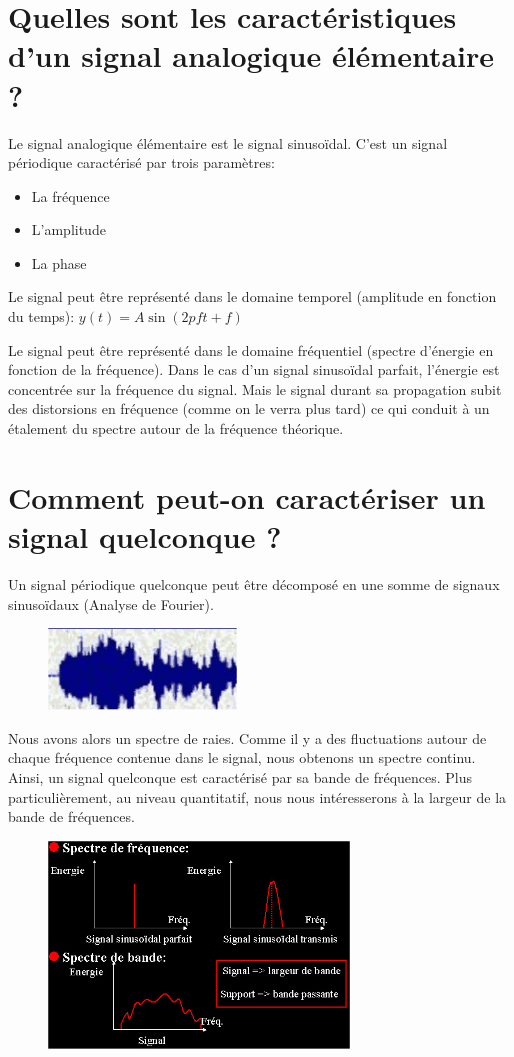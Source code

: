 \section{Quelles sont les caractéristiques d'un signal analogique élémentaire ?}
Le signal analogique élémentaire est le signal sinusoïdal. C'est un signal périodique
caractérisé par trois paramètres:

\begin{itemize}
	\item La fréquence
	\item L'amplitude
	\item La phase
\end{itemize}
Le signal peut être représenté dans le domaine temporel (amplitude en fonction du temps):
$y(t)=A \sin(2 pft+f)$

Le signal peut être représenté dans le domaine fréquentiel (spectre d'énergie en fonction de
la fréquence). Dans le cas d'un signal sinusoïdal parfait, l'énergie est concentrée sur la
fréquence du signal. Mais le signal durant sa propagation subit des distorsions en fréquence
(comme on le verra plus tard) ce qui conduit à un étalement du spectre autour de la fréquence
théorique.

\section{Comment peut-on caractériser un signal quelconque ?}
Un signal périodique quelconque peut être décomposé en une somme de signaux sinusoïdaux
(Analyse de Fourier).
\begin{figure}[H]
	\centering
	\includegraphics[width=5cm]{partie2/signalaudio.jpg}
\end{figure}

Nous avons alors un spectre de raies. Comme il y a des fluctuations autour de chaque fréquence
contenue dans le signal, nous obtenons un spectre continu. Ainsi, un signal quelconque est
caractérisé par sa bande de fréquences. Plus particulièrement, au niveau quantitatif, nous
nous intéresserons à la largeur de la bande de fréquences.
\begin{figure}[H]
	\centering
	\includegraphics[width=8cm]{partie2/signalfourrier.jpg}
\end{figure}


